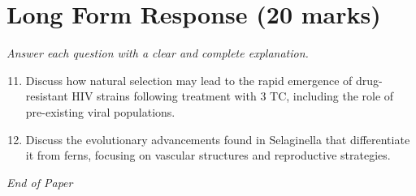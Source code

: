 \documentclass[12pt]{article}
\begin{document}
\section*{Long Form Response (20 marks)}
\textit{Answer each question with a clear and complete explanation.}
\begin{enumerate}[label=\arabic*.]
\setcounter{enumi}{10}
\item Discuss how natural selection may lead to the rapid emergence of drug-resistant HIV strains following treatment with 3 TC, including the role of pre-existing viral populations.
\item Discuss the evolutionary advancements found in Selaginella that differentiate it from ferns, focusing on vascular structures and reproductive strategies.
\end{enumerate}

\vfill
\noindent\textit{End of Paper}
\end{document}
